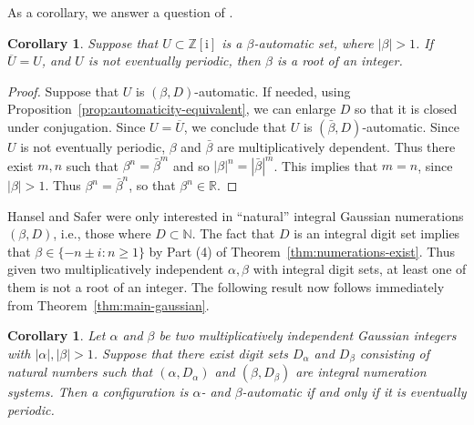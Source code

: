 \documentclass{amsart}
\newcommand{\Z}{\mathbb{Z}}
\newcommand{\ii}{\mathrm{i}}
\newtheorem*{main theorem}{Theorem \ref{thm:main-gaussian}}
\newtheorem{corollary}[theorem]{Corollary}
\theoremstyle{definition}
\begin{document}
As a corollary, we answer a question of \cite{Bosma-Fokkink-Krebs}. %
\begin{corollary}
Suppose that $U\subset \Z[\ii]$ is a $\beta$-automatic set, where $|\beta|>1$. If $\overline U = U$, and $U$ is not eventually periodic, then $\beta$ is a root of an integer.
\end{corollary}
\begin{proof} Suppose that $U$ is $(\beta, D)$-automatic. If needed,  using Proposition~\ref{prop:automaticity-equivalent}, we can enlarge $D$ so that it is closed under conjugation. Since $U=\overline U$, we conclude that $U$ is $(\bar \beta, D)$-automatic.  Since $U$ is not eventually periodic,  $\beta$ and $\bar\beta$ are multiplicatively dependent. Thus there exist $m, n$ such that  $\beta^n=\bar \beta^m$ and so
$|\beta|^n=|\bar \beta|^m$. This implies that  $m=n$, since $|\beta|>1$. Thus 
$\beta^n=\bar \beta^n$, so that
$\beta^n\in\mathbb R$.
\end{proof}




Hansel and Safer were only interested in ``natural'' integral Gaussian numerations $(\beta,D)$, i.e., those where  $D\subset \mathbb N$. 
The fact   that  $D$  is an integral digit set implies that $\beta\in \{-n\pm i : n\geq 1 \}$ by Part (4) of Theorem~\ref{thm:numerations-exist}. Thus given two multiplicatively independent  $\alpha, \beta$ with integral digit sets, at least one of them is not a root of an integer. 
   The following result now follows immediately from Theorem~\ref{thm:main-gaussian}.



\begin{corollary}
Let $\alpha$ and $\beta$ be two multiplicatively independent Gaussian integers with $|\alpha|, |\beta|>1$. Suppose that there exist digit sets
 $D_\alpha$ and $D_\beta$ consisting of natural numbers such that $(\alpha,D_\alpha)$ and $(\beta,D_\beta)$ are integral numeration systems.
Then a configuration is  $\alpha$- and $\beta$-automatic  if and only if  it is eventually periodic. 
\end{corollary}
\end{document}

